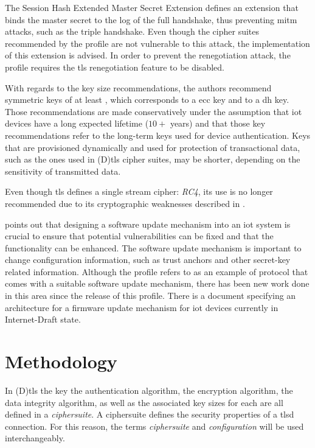 \documentclass{llncs}
\begin{document}
The Session Hash Extended Master Secret Extension\cite{RFC7627} defines an extension
that binds the master secret to the log of the full handshake, thus preventing
\gls{mitm} attacks, such as the triple handshake\cite{TripleHa89:online}. Even though the
cipher suites recommended by the profile are not vulnerable to this attack, the
implementation of this extension is advised. In order to prevent the renegotiation
attack\cite{RFC5746}, the profile requires the \gls{tls} renegotiation feature
to be disabled.

With regards to the key size recommendations, the authors recommend symmetric keys
of at least , which corresponds to a  \gls{ecc}
key and to a  \gls{dh} key. Those recommendations are made
conservatively under the assumption that \gls{iot} devices have a long expected
lifetime ($10+$ years) and that those key recommendations refer to the long-term
keys used for device authentication. Keys that are provisioned dynamically
and used for protection of transactional data, such as the ones used in
(D)\gls{tls} cipher suites, may be shorter, depending on the sensitivity of
transmitted data.

Even though \gls{tls} defines a single stream cipher: \textit{RC4}, its use is no longer
recommended due to its cryptographic weaknesses described in \cite{RFC7465}.

\cite{RFC7925} points out that designing a software
update mechanism into an \gls{iot} system is crucial to ensure that potential vulnerabilities
can be fixed and that the functionality can be enhanced. The software update mechanism
is important to change configuration information, such as trust anchors and
other secret-key related information. Although the profile refers to \cite{OpenMobi29:online}
as an example of protocol that comes with a suitable software update mechanism,
there has been new work done in this area since the release of this profile.
There is a document specifying an architecture for a firmware update
mechanism for \gls{iot} devices\cite{I-D.moran-suit-architecture} currently in Internet-Draft state.

\section{Methodology}

In (D)\gls{tls} the key the authentication algorithm, the encryption algorithm, the
data integrity algorithm, as well as the associated key sizes for each are all defined in a \textit{ciphersuite}.
A ciphersuite defines the security properties of a \acrshort{tlsd} connection. For this reason, the terms
\textit{ciphersuite} and \textit{configuration} will be used interchangeably.
\end{document}
